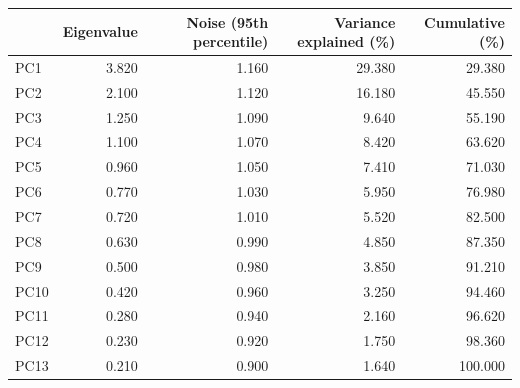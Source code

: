 \begin{tabular}{lrrrr}
\toprule
 & Eigenvalue & Noise (95th percentile) & Variance explained (\%) & Cumulative (\%) \\
\midrule
PC1 & 3.820 & 1.160 & 29.380 & 29.380 \\
PC2 & 2.100 & 1.120 & 16.180 & 45.550 \\
PC3 & 1.250 & 1.090 & 9.640 & 55.190 \\
PC4 & 1.100 & 1.070 & 8.420 & 63.620 \\
PC5 & 0.960 & 1.050 & 7.410 & 71.030 \\
PC6 & 0.770 & 1.030 & 5.950 & 76.980 \\
PC7 & 0.720 & 1.010 & 5.520 & 82.500 \\
PC8 & 0.630 & 0.990 & 4.850 & 87.350 \\
PC9 & 0.500 & 0.980 & 3.850 & 91.210 \\
PC10 & 0.420 & 0.960 & 3.250 & 94.460 \\
PC11 & 0.280 & 0.940 & 2.160 & 96.620 \\
PC12 & 0.230 & 0.920 & 1.750 & 98.360 \\
PC13 & 0.210 & 0.900 & 1.640 & 100.000 \\
\bottomrule
\end{tabular}
